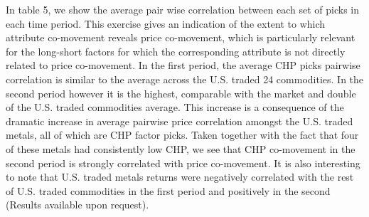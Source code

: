 \documentclass[11pt, letterpaper, doublespacing]{article}
\begin{document}
In table 5, we show the average pair wise correlation between each set
of picks in each time period. This exercise gives an indication of the
extent to which attribute co-movement reveals price co-movement, which
is particularly relevant for the long-short factors for which the
corresponding attribute is not directly related to price co-movement. In
the first period, the average CHP picks pairwise correlation is similar
to the average across the U.S. traded 24 commodities. In the second
period however it is the highest, comparable with the market and double
of the U.S. traded commodities average. This increase is a consequence
of the dramatic increase in average pairwise price correlation amongst
the U.S. traded metals, all of which are CHP factor picks. Taken
together with the fact that four of these metals had consistently low
CHP, we see that CHP co-movement in the second period is strongly
correlated with price co-movement. It is also interesting to note that
U.S. traded metals returns were negatively correlated with the rest of
U.S. traded commodities in the first period and positively in the second
(Results available upon request).
\end{document}
